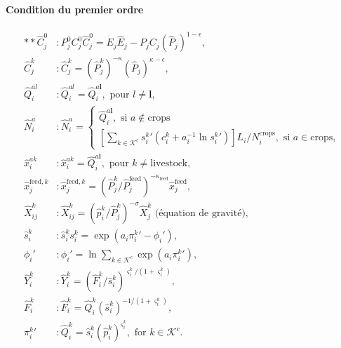 \paragraph{Condition du premier ordre}
\begin{align}
    ** \hat{C}_j^0            & : P_j^0 C_j^0 \hat{C}_j^0 = E_j \hat{E}_j - P_jC_j (\hat{P}_j)^{1 - \epsilon},                                                      \\
    \hat{C}_j^k               & : \hat{C}_j^k = (\hat{P}_j^k)^{-\kappa} (\hat{P}_j)^{\kappa - \epsilon},                                                            \\
    \hat{Q}_i^{al}            & : \hat{Q}_i^{al}=\hat{Q}_i^{a \mathbf{l}}, \text{ pour } l \neq \mathbf{l},                                                         \\
    \hat{N}_i^a               & : \hat{N}_i^a =
    \begin{cases}
        \hat{Q}_i^{a \mathbf{l}}, \text{ si } a \notin \text{crops} \\
        \left[\sum_{k \in \mathcal{K}^c} {s_i^k}\prime \left(c_i^k+a_i^{-1} \ln {s_i^k}\prime  \right) \right] L_i / N_i^{\text{crops}}, \text{ si } a \in \text{crops},
    \end{cases}                                    \\
    \hat{x}_i^{ak}            & :\hat{x}_i^{ak}=\hat{Q}_i^{a \mathbf{l}}, \text{ pour } k \neq \text{livestock},                                                    \\
    \hat{x}^{\text{feed},k}_j & : \hat{x}^{\text{feed},k}_j = \left({\hat{P}_j^k} /{\hat{P}_j^{\text{feed}}} \right)^{-\kappa_{\text{feed}}} \hat{x}_j^\text{feed}, \\
    \hat{X}_{ij}^k            & : \hat{X}_{ij}^k = (\hat{p}_i^k/\hat{P}_j^k)^{-\sigma} \hat{X}_j^k \text{ (équation de gravité)},                                   \\
    \hat{s}_{i}^{k}           & : \hat{s}_i^k s_i^k = \exp \left( a_i {\pi_i^k}\prime - \phi_i\prime \right),                                                       \\
    \phi_i\prime              & : \phi_i\prime = \ln \sum_{k \in \mathcal{K}^c} \exp(a_i {\pi_i^k}\prime),                                                          \\
    \hat{Y}_i^k               & : \hat{Y}_i^k = \left(\hat{F}_i^k / \hat{s}_i^k \right)^{\varsigma_i^k/(1+\varsigma_i^k)},                                          \\
    \hat{F}_i^k               & : \hat{F}_i^k = \hat{Q}_i^k (\hat{s}_i^k)^{- 1 / (1 + \varsigma_i^k)},                                                              \\
    {\pi_i^k}\prime           & : \hat{Q}_i^k = \hat{s}_i^k \left(\hat{p}_i^k \right)^{\varsigma_i^k}, \text{ for } k\in \mathcal{K}^{c}.
\end{align}

